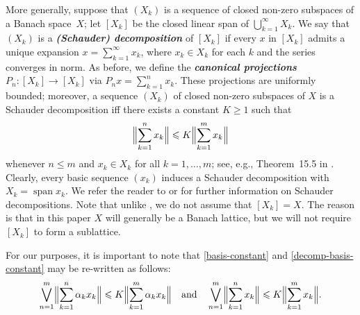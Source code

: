 \documentclass[12pt]{amsart}
\theoremstyle{plain}
\theoremstyle{definition}
\newcommand{\Bignorm}[1]{\Bigl\lVert#1\Bigr\rVert}
\newcommand{\term}[1]{{\textit{\textbf{#1}}}}   %
\newcommand{\s}{\sum_{k=1}^\infty}
\DeclareMathOperator{\Span}{span}
\renewcommand{\le}{\leqslant}
\renewcommand{\ge}{\geqslant}
\begin{document}
More generally, suppose that $(X_k)$ is a sequence of closed non-zero
subspaces of a Banach space~$X$; let $[X_k]$ be the closed linear span
of $\bigcup_{k=1}^\infty X_k$. We say that $(X_k)$ is a
\term{(Schauder) decomposition} of $[X_k]$ if every $x$ in $[X_k]$
admits a unique expansion $x=\s x_k$, where $x_k\in X_k$ for each $k$
and the series converges in norm. As before, we define the
\term{canonical projections} $P_n\colon[X_k]\to[X_k]$ via
$P_nx=\sum_{k=1}^nx_k$. These projections are uniformly bounded;
moreover, a sequence $(X_k)$ of closed non-zero subspaces of $X$ is a
Schauder decomposition iff there exists a constant $K\ge 1$ such that
\begin{equation}
  \label{decomp-basis-constant}
    \Bignorm{\sum_{k=1}^nx_k}\le K\Bignorm{\sum_{k=1}^mx_k}
\end{equation}
whenever $n\le m$ and $x_k\in X_k$ for all $k=1,\dots,m$; see, e.g.,
Theorem~15.5 in \cite[p.~502]{Singer:81}. Clearly, every basic
sequence $(x_k)$ induces a Schauder decomposition with
$X_k=\Span x_k$. We refer the reader to \cite[\S 15]{Singer:81} or
\cite[1.g]{Lindenstrauss:77} for further information on Schauder
decompositions. Note that unlike \cite{Singer:81,Lindenstrauss:77}, we
do not assume that $[X_k]=X$. The reason is that in this paper $X$
will generally be a Banach lattice, but we will not require $[X_k]$ to
form a sublattice.

For our purposes, it is important to note that \eqref{basis-constant}
and \eqref{decomp-basis-constant} may be re-written as follows:
\begin{displaymath}
  \bigvee_{n=1}^m\Bignorm{\sum_{k=1}^n\alpha_kx_k}
  \le K\Bignorm{\sum_{k=1}^m\alpha_kx_k}
  \quad\mbox{and}\quad
  \bigvee_{n=1}^m\Bignorm{\sum_{k=1}^nx_k}
  \le K\Bignorm{\sum_{k=1}^mx_k}.
\end{displaymath}
\end{document}
